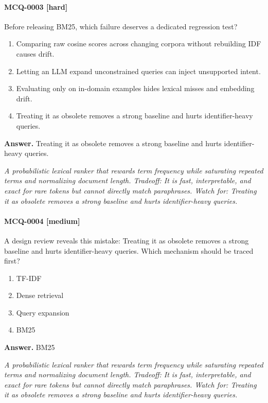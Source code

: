 \paragraph{MCQ-0003 [hard]} Before releasing BM25, which failure deserves a dedicated regression test?
\begin{enumerate}[label=\Alph*.]
\item Comparing raw cosine scores across changing corpora without rebuilding IDF causes drift.
\item Letting an LLM expand unconstrained queries can inject unsupported intent.
\item Evaluating only on in-domain examples hides lexical misses and embedding drift.
\item Treating it as obsolete removes a strong baseline and hurts identifier-heavy queries.
\end{enumerate}
\noindent\textbf{Answer.} Treating it as obsolete removes a strong baseline and hurts identifier-heavy queries.
\par\textit{A probabilistic lexical ranker that rewards term frequency while saturating repeated terms and normalizing document length. Tradeoff: It is fast, interpretable, and exact for rare tokens but cannot directly match paraphrases. Watch for: Treating it as obsolete removes a strong baseline and hurts identifier-heavy queries.}
\paragraph{MCQ-0004 [medium]} A design review reveals this mistake: Treating it as obsolete removes a strong baseline and hurts identifier-heavy queries. Which mechanism should be traced first?
\begin{enumerate}[label=\Alph*.]
\item TF-IDF
\item Dense retrieval
\item Query expansion
\item BM25
\end{enumerate}
\noindent\textbf{Answer.} BM25
\par\textit{A probabilistic lexical ranker that rewards term frequency while saturating repeated terms and normalizing document length. Tradeoff: It is fast, interpretable, and exact for rare tokens but cannot directly match paraphrases. Watch for: Treating it as obsolete removes a strong baseline and hurts identifier-heavy queries.}
